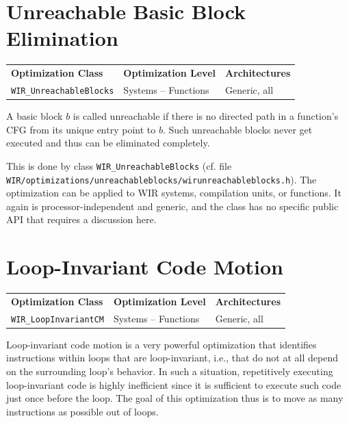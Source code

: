 \section{Unreachable Basic Block Elimination}
\label{sec:optunreachablebbs}

\begin{tabular}{|l|l|l|}
  \hline
  \textbf{Optimization Class} & \textbf{Optimization Level} & \textbf{Architectures} \\
  \hhline{|=|=|=|}
  \texttt{WIR\_UnreachableBlocks} & Systems -- Functions & Generic, all \\
  \hline
\end{tabular}

A basic block $b$ is called unreachable if there is no directed path in a function's \gls{CFG} from its unique entry point to $b$.
Such unreachable blocks never get executed and thus can be eliminated completely.

This is done by class \texttt{WIR\_UnreachableBlocks} (cf. file \texttt{WIR/optimizations/unreachableblocks/wirun\-reachableblocks.h}).
The optimization can be applied to \gls{WIR} systems, compilation units, or functions.
It again is processor-independent and generic, and the class has no specific public \gls{API} that requires a discussion here.


\section{Loop-Invariant Code Motion}
\label{sec:optlicm}

\begin{tabular}{|l|l|l|}
  \hline
  \textbf{Optimization Class} & \textbf{Optimization Level} & \textbf{Architectures} \\
  \hhline{|=|=|=|}
  \texttt{WIR\_LoopInvariantCM} & Systems -- Functions & Generic, all \\
  \hline
\end{tabular}

Loop-invariant code motion is a very powerful optimization that identifies instructions within loops that are loop-invariant, i.e., that do not at all depend on the surrounding loop's behavior.
In such a situation, repetitively executing loop-invariant code is highly inefficient since it is sufficient to execute such code just once before the loop.
The goal of this optimization thus is to move as many instructions as possible out of loops.

